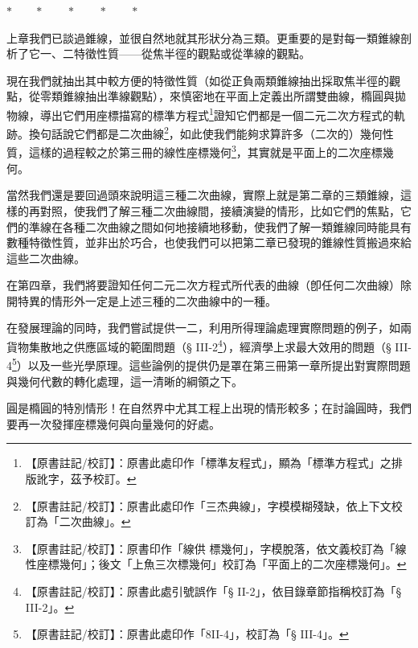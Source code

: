 \begin{center}
$* \qquad * \qquad * \qquad * \qquad *$
\end{center}

上章我們已談過錐線，並很自然地就其形狀分為三類。更重要的是對每一類錐線剖析了它一、二特徵性質——從焦半徑的觀點或從準線的觀點。

現在我們就抽出其中較方便的特徵性質（如從正負兩類錐線抽出採取焦半徑的觀點，從零類錐線抽出準線觀點），來慎密地在平面上定義出所謂雙曲線，橢圓與拋物線，導出它們用座標描寫的標準方程式\label{note:b4s-ch3-biaozhunfangcheng}\footnote{【原書註記/校訂】：原書此處印作「標準友程式」，顯為「標準方程式」之排版訛字，茲予校訂。}證知它們都是一個二元二次方程式的軌跡。換句話說它們都是二次曲線\label{note:b4s-ch3-ercichuxian}\footnote{【原書註記/校訂】：原書此處印作「三杰典線」，字模模糊殘缺，依上下文校訂為「二次曲線」。}，如此使我們能夠求算許多（二次的）幾何性質，這樣的過程較之於第三冊的線性座標幾何\label{note:b4s-ch3-zuobiaojihe}\footnote{【原書註記/校訂】：原書印作「線供 標幾何」，字模脫落，依文義校訂為「線性座標幾何」；後文「上魚三次標幾何」校訂為「平面上的二次座標幾何」。}，其實就是平面上的二次座標幾何。

當然我們還是要回過頭來說明這三種二次曲線，實際上就是第二章的三類錐線，這樣的再對照，使我們了解三種二次曲線間，接續演變的情形，比如它們的焦點，它們的準線在各種二次曲線之間如何地接續地移動，使我們了解一類錐線同時能具有數種特徵性質，並非出於巧合，也使我們可以把第二章已發現的錐線性質搬過來給這些二次曲線。

在第四章，我們將要證知任何二元二次方程式所代表的曲線（卽任何二次曲線）除開特異的情形外一定是上述三種的二次曲線中的一種。

在發展理論的同時，我們嘗試提供一二，利用所得理論處理實際問題的例子，如兩貨物集散地之供應區域的範圍問題（§ III-2\label{note:b4s-ch3-sec-ref-2}\footnote{【原書註記/校訂】：原書此處引號誤作「§ II-2」，依目錄章節指稱校訂為「§ III-2」。}），經濟學上求最大效用的問題（§ III-4\label{note:b4s-ch3-sec-ref-4}\footnote{【原書註記/校訂】：原書此處印作「8II-4」，校訂為「§ III-4」。}）以及一些光學原理。這些論例的提供仍是罩在第三冊第一章所提出對實際問題與幾何代數的轉化處理，這一清晰的綱領之下。

圓是橢圓的特別情形！在自然界中尤其工程上出現的情形較多；在討論圓時，我們要再一次發揮座標幾何與向量幾何的好處。

